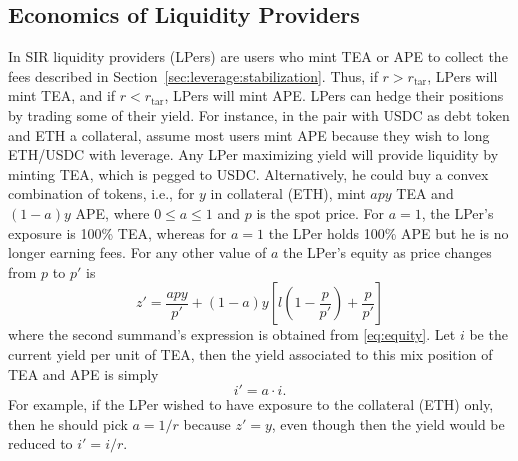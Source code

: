 \documentclass[journal,letterpaper,oneside,onecolumn,12pt]{IEEEtran}
\begin{document}
	
	
	\subsection{Economics of Liquidity Providers}
	
	In SIR liquidity providers (LPers) are users who mint TEA or APE to collect the fees described in Section~\ref{sec:leverage:stabilization}. Thus, if $r>r_\textrm{tar}$, LPers will mint TEA, and if $r<r_\textrm{tar}$, LPers will mint APE. 	
	LPers can hedge their positions by trading some of their yield. For instance, in the pair with USDC as debt token and ETH a collateral, assume most users mint APE because they wish to long ETH/USDC with leverage. Any LPer maximizing yield will provide liquidity by minting TEA, which is pegged to USDC. Alternatively, he could buy a convex combination of tokens, i.e., for $y$ in collateral (ETH), mint $apy$ TEA and $(1-a)y$ APE, where $0\leq a\leq1$ and $p$ is the spot price. For $a=1$, the LPer's exposure is 100\% TEA, whereas for $a=1$ the LPer holds 100\% APE but he is no longer earning fees. For any other value of $a$ the LPer's equity as price changes from $p$ to $p'$ is
	\begin{equation}
		z' = \frac{apy}{p'}+(1-a)y\left[l\left(1-\frac{p}{p'}\right)+\frac{p}{p'}\right]
	\end{equation}
	where the second summand's expression is obtained from \eqref{eq:equity}. Let $i$ be the current yield per unit of TEA, then the yield associated to this mix position of TEA and APE is simply
	\begin{equation}
		i' = a\cdot i.
	\end{equation}
	For example, if the LPer wished to have exposure to the collateral (ETH) only, then he should pick $a=1/r$ because $z'=y$, even though then the yield would be reduced to $i'=i/r$.
	
\end{document}
